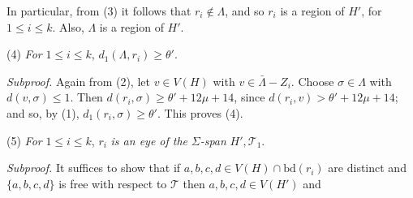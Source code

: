 In particular, from (3) it follows that $r_i \notin \Lambda$, and so $r_i$ is a region of $H'$, for $1 \le i \le k$. Also, $\Lambda$ is a region of $H'$.

\hspace*{12pt}(4) \textit{For} $1 \le i \le k$, $d_1(\Lambda, r_i) \ge \theta'$.

\textit{Subproof.} Again from (2), let $v \in V(H)$ with $v \in \bar{\Lambda} - Z_i$. Choose $\sigma \in \Lambda$ with $d(v, \sigma) \le 1$. Then $d(r_i, \sigma) \ge \theta' + 12\mu + 14$, since $d(r_i, v) > \theta' + 12\mu + 14$; and so, by (1), $d_1(r_i, \sigma) \ge \theta'$. This proves (4).

\hspace*{12pt}(5) \textit{For} $1 \le i \le k$, $r_i$ \textit{is an eye of the} $\Sigma$\textit{-span} $H', \mathcal{T}_1$.

\textit{Subproof.} It suffices to show that if $a, b, c, d \in V(H) \cap \text{bd}(r_i)$ are distinct and $\{a, b, c, d\}$ is free with respect to $\mathcal{T}$ then $a, b, c, d \in V(H')$ and
